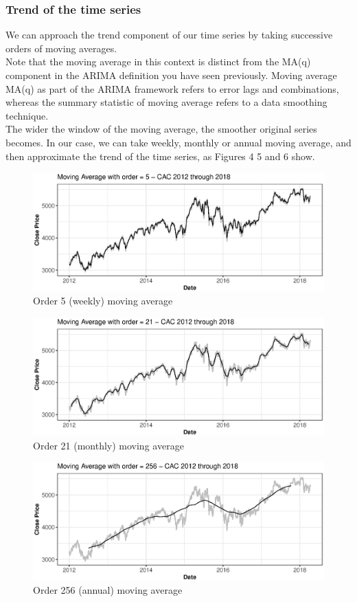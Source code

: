 \subsubsection{Trend of the time series}
We can approach the trend component of our time series by taking successive orders of moving averages.\\
Note that the moving average in this context is distinct from the MA(q) component in the  ARIMA definition you have seen previously. Moving average MA(q) as part of the ARIMA framework refers to error lags and combinations, whereas the summary statistic of moving average refers to a data smoothing technique. \\
The wider the window of the moving average, the smoother original series becomes. In our case, we can take weekly, monthly or annual moving average, and then approximate the trend of the time series, as Figures 4 5 and 6 show.
\\
\FloatBarrier
\begin{figure}[!htbp]
  \centering
  \includegraphics[width=\textwidth]{img/Fig4.eps}
  \caption{Order 5 (weekly) moving average}
\end{figure}
\FloatBarrier
\FloatBarrier
\begin{figure}[!htbp]
  \centering
  \includegraphics[width=\textwidth]{img/Fig5.eps}
  \caption{Order 21 (monthly) moving average}
\end{figure}
\FloatBarrier
\FloatBarrier
\begin{figure}[!htbp]
  \centering
  \includegraphics[width=\textwidth]{img/Fig6.eps}
  \caption{Order 256 (annual) moving average}
\end{figure}
\FloatBarrier


